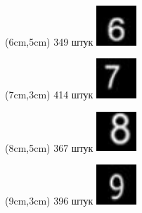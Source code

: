 \documentclass{beamer}
\begin{document}
\begin{frame}
\begin{textblock*}{1.5cm}(6cm,5cm)
\tiny 349 штук
\includegraphics[width=1.5cm]{6_00059}
\end{textblock*}

\begin{textblock*}{1.5cm}(7cm,3cm)
\tiny 414 штук
\includegraphics[width=1.5cm]{7_00081}
\end{textblock*}

\begin{textblock*}{1.5cm}(8cm,5cm)
\tiny 367 штук
\includegraphics[width=1.5cm]{8_00068}
\end{textblock*}

\begin{textblock*}{1.5cm}(9cm,3cm)
\tiny 396 штук
\includegraphics[width=1.5cm]{9_00091}
\end{textblock*}

\end{frame}
\end{document}
